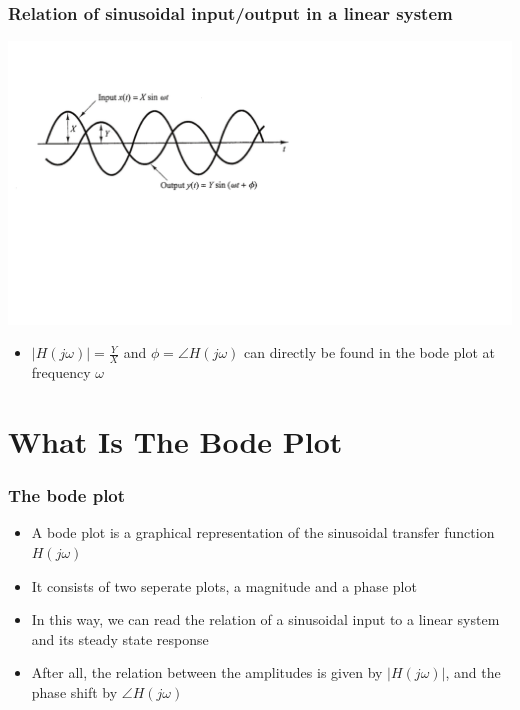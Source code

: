 \begin{frame}
\frametitle{Relation of sinusoidal input/output in a linear system}


\includegraphics[scale=0.5]{IOSinus}


\begin{itemize}
\item $|H(j\omega)| = \frac{Y}{X}$ and $\phi = \angle H(j\omega)$ can directly be found in the bode plot at frequency $\omega$
\end{itemize}

\end{frame}

\section{What Is The Bode Plot}

\begin{frame}
\frametitle{The bode plot}

\begin{itemize}
\item A bode plot is a graphical representation of the sinusoidal transfer function $H(j\omega)$
\item It consists of two seperate plots, a magnitude and a phase plot
\item In this way, we can read the relation of a sinusoidal input to a linear system and its steady state response
\item After all, the relation between the amplitudes is given by $|H(j\omega)|$, and the phase shift by $\angle H(j\omega)$

\end{itemize}


\end{frame}


